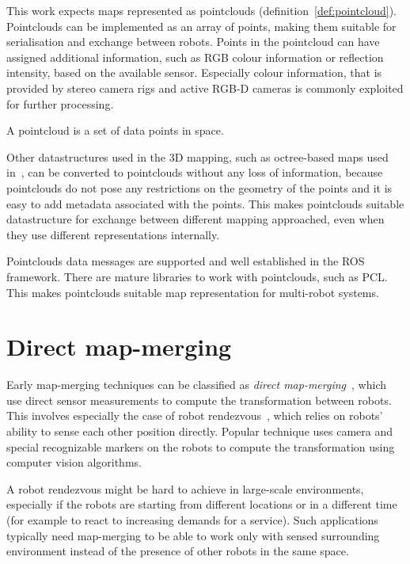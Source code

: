 This work expects maps represented as pointclouds (definition~\ref{def:pointcloud}). Pointclouds can be implemented as an array of points, making them suitable for serialisation and exchange between robots. Points in the pointcloud can have assigned additional information, such as RGB colour information or reflection intensity, based on the available sensor. Especially colour information, that is provided by stereo camera rigs and active RGB-D cameras is commonly exploited for further processing.

\begin{defn}[Pointcloud]
\label{def:pointcloud}
A pointcloud is a set of data points in space.
\end{defn}

Other datastructures used in the 3D mapping, such as octree-based maps used in~\cite{hornung2013octomap}, can be converted to pointclouds without any loss of information, because pointclouds do not pose any restrictions on the geometry of the points and it is easy to add metadata associated with the points. This makes pointclouds suitable datastructure for exchange between different mapping approached, even when they use different representations internally.

Pointclouds data messages are supported and well established in the \gls{ROS} framework. There are mature libraries to work with pointclouds, such as \gls{PCL}. This makes pointclouds suitable map representation for multi-robot systems.

\section{Direct map-merging}

Early map-merging techniques can be classified as \textit{direct map-merging}~\cite{lee2012survey}, which use direct sensor measurements to compute the transformation between robots. This involves especially the case of robot rendezvous~\cite{zhou2006rendezvous}, which relies on robots' ability to sense each other position directly. Popular technique uses camera and special recognizable markers on the robots to compute the transformation using computer vision algorithms.

A robot rendezvous might be hard to achieve in large-scale environments, especially if the robots are starting from different locations or in a different time (for example to react to increasing demands for a service). Such applications typically need map-merging to be able to work only with sensed surrounding environment instead of the presence of other robots in the same space.

